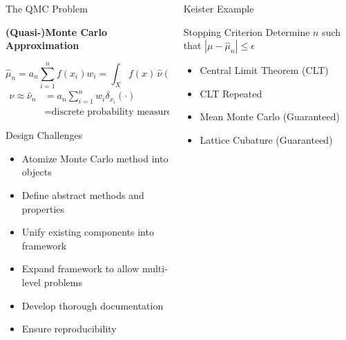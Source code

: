 \documentclass[final]{beamer}
\newcommand{\bfCenter}[1]{\centerline{\textbf{#1}}}
\newlength{\onecolwid}
\newcommand{\dif}{\mathrm{d}}
\begin{document}
\begin{frame}[t]
\begin{columns}[t]
\begin{column}{\onecolwid}
\begin{block}{The QMC Problem}
    
    \bfCenter{(Quasi-)Monte Carlo Approximation}
        \begin{equation*}
            \hat{\mu}_n = a_n \sum_{i=1}^{n} f(x_i)w_i =  \int_{X} f(x) \, \hat{\nu}( \dif x)
            \label{qmcApprox}
        \end{equation*}
        \begin{align*}
            \nu \approx \hat{\nu}_n & = a_n \sum_{i=1}^n w_i \delta_{\hat{x_i}}(\cdot) \\
            & = \text{discrete probability measure}
        \end{align*}
\end{block}

\vspace{-.25in}
\begin{block}{Design Challenges}
    \begin{itemize}
        \item Atomize Monte Carlo method into objects
        \item Define abstract methods and properties
        \item Unify existing components into framework
        \item Expand framework to allow multi-level problems
        \item Develop thorough documentation 
        \item Ensure reproducibility
    \end{itemize}
\end{block}
\end{column}

\begin{column}{\onecolwid}\vspace{-.25in}

\begin{block}{Keister Example}

\end{block}

\vspace{-.1in}
\begin{alertblock}{Stopping Criterion}
    Determine $n$ such that $\left | \mu - \hat{\mu}_n \right  | \leq \epsilon$
    \begin{itemize}
        \item Central Limit Theorem (CLT)
        \item CLT Repeated
        \item Mean Monte Carlo (Guaranteed)
        \item Lattice Cubature (Guaranteed)
    \end{itemize}
\end{alertblock}


\end{column}
\end{columns}
\end{frame}
\end{document}
